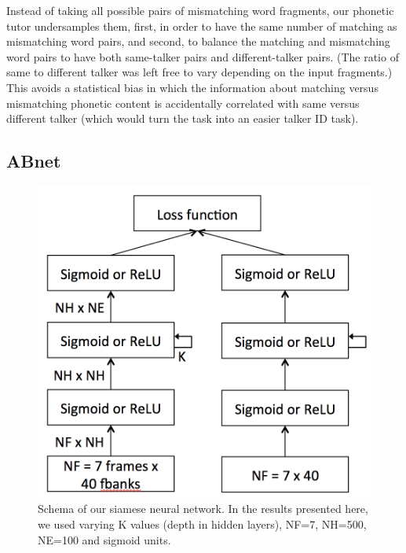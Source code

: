 \documentclass[a4paper]{article}
\begin{document}
Instead of taking all possible pairs of mismatching word fragments, our phonetic tutor undersamples them, first, in order to have the same number of matching as mismatching word pairs, and second, to balance the matching and mismatching word pairs to have both same-talker pairs and different-talker pairs. (The ratio of same to different talker was left free to vary depending on the input fragments.) This avoids a statistical bias in which the information about matching versus mismatching phonetic content is accidentally correlated with same versus different talker (which would turn the task into an easier talker ID task).

\subsection{ABnet}

\begin{figure}[h]
    \begin{center}
        \includegraphics[width=0.68\columnwidth]{abnet}
        \caption{Schema of our siamese neural network. In the results presented here, we used varying K values (depth in hidden layers), NF=7, NH=500, NE=100 and sigmoid units.}
    \end{center}
    \label{fig:abnet}
\end{figure}
\end{document}
